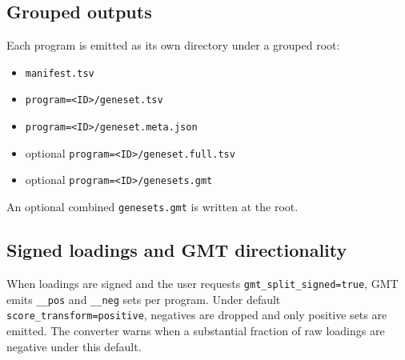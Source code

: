 \documentclass[11pt]{article}
\begin{document}
\subsection*{Grouped outputs}
Each program is emitted as its own directory under a grouped root:
\begin{itemize}[leftmargin=2em]
\item \texttt{manifest.tsv}
\item \texttt{program=<ID>/geneset.tsv}
\item \texttt{program=<ID>/geneset.meta.json}
\item optional \texttt{program=<ID>/geneset.full.tsv}
\item optional \texttt{program=<ID>/genesets.gmt}
\end{itemize}
An optional combined \texttt{genesets.gmt} is written at the root.

\subsection*{Signed loadings and GMT directionality}
When loadings are signed and the user requests \texttt{gmt\_split\_signed=true}, GMT emits \texttt{\_\_pos} and \texttt{\_\_neg} sets per program.
Under default \texttt{score\_transform=positive}, negatives are dropped and only positive sets are emitted. The converter warns when a substantial fraction of raw loadings are negative under this default.
\end{document}
